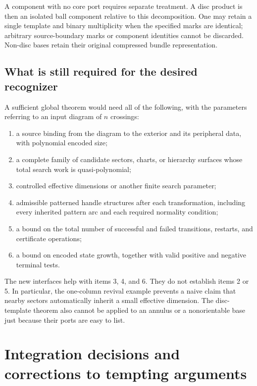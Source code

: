 \documentclass[11pt]{article}
\theoremstyle{definition}
\theoremstyle{remark}
\begin{document}
A component with no core port requires separate treatment. A disc product
is then an isolated ball component relative to this decomposition.
One may retain a single template and binary multiplicity when the
specified marks are identical; arbitrary source-boundary marks or
component identities cannot be discarded. Non-disc bases retain their
original compressed bundle representation.

\subsection{What is still required for the desired recognizer}

A sufficient global theorem would need all of the following, with the
parameters referring to an input diagram of \(n\) crossings:
\begin{enumerate}
\item a source binding from the diagram to the exterior and its peripheral
data, with polynomial encoded size;
\item a complete family of candidate sectors, charts, or hierarchy surfaces
whose total search work is quasi-polynomial;
\item controlled effective dimensions or another finite search parameter;
\item admissible patterned handle structures after each transformation,
including every inherited pattern arc and each required normality
condition;
\item a bound on the total number of successful and failed transitions,
restarts, and certificate operations;
\item a bound on encoded state growth, together with valid positive and
negative terminal tests.
\end{enumerate}
The new interfaces help with items 3, 4, and 6. They do not establish
items 2 or 5. In particular, the one-column revival example prevents a
naive claim that nearby sectors automatically inherit a small effective
dimension. The disc-template theorem also cannot be applied to an annulus
or a nonorientable base just because their ports are easy to list.





\section{Integration decisions and corrections to tempting arguments}
\label{sec:decisions}
\end{document}
